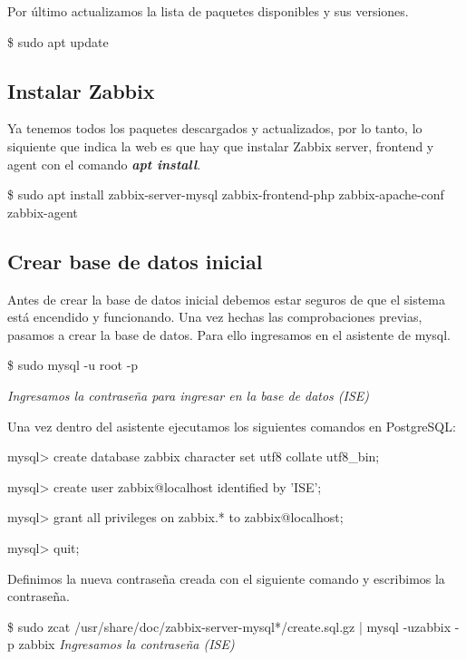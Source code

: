     Por último actualizamos la lista de paquetes disponibles y sus versiones.
        \begin{tcolorbox}[colback=black!10, halign=left]
            \$ sudo apt update
        \end{tcolorbox}

    \newpage
    \subsection{Instalar Zabbix}

    Ya tenemos todos los paquetes descargados y actualizados, por lo tanto, lo siquiente que indica la web es que hay que instalar Zabbix server, frontend
    y agent con el comando \textbf{\emph{apt install}}.
        \begin{tcolorbox}[colback=black!10, halign=left]
            \$ sudo apt install zabbix-server-mysql zabbix-frontend-php zabbix-apache-conf zabbix-agent
        \end{tcolorbox}
    
    \subsection{Crear base de datos inicial}
    Antes de crear la base de datos inicial debemos estar seguros de que el sistema está encendido y funcionando. Una vez hechas las comprobaciones previas,
    pasamos a crear la base de datos. Para ello ingresamos en el asistente de mysql.
        \begin{tcolorbox}[colback=black!10, halign=left]
            \$ sudo mysql -u root -p

            \emph{Ingresamos la contraseña para ingresar en la base de datos (ISE)}
        \end{tcolorbox}

    Una vez dentro del asistente ejecutamos los siguientes comandos en PostgreSQL:
        \begin{tcolorbox}[colback=black!10, halign=left]
            mysql> create database zabbix character set utf8 collate utf8\_bin;

            mysql> create user zabbix@localhost identified by 'ISE';

            mysql> grant all privileges on zabbix.* to zabbix@localhost;

            mysql> quit;
        \end{tcolorbox}

    Definimos la nueva contraseña creada con el siguiente comando y escribimos la contraseña.
        \begin{tcolorbox}[colback=black!10, halign=left]
            \$ sudo zcat /usr/share/doc/zabbix-server-mysql*/create.sql.gz | mysql -uzabbix -p zabbix
            \emph{Ingresamos la contraseña (ISE)}
        \end{tcolorbox}

